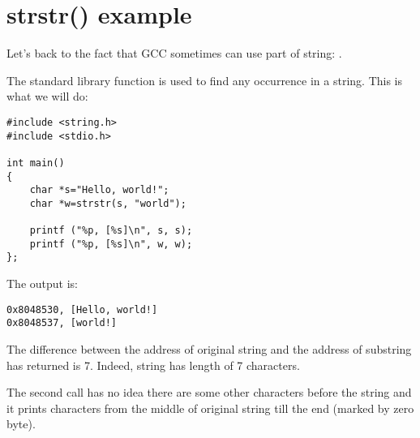 \section{strstr() example}
\label{strstr_example}

Let's back to the fact that GCC sometimes can use part of string: .

The  \CCpp standard library function is used to find any occurrence in a string.
This is what we will do:

\begin{lstlisting}
#include <string.h>
#include <stdio.h>

int main()
{
	char *s="Hello, world!";
	char *w=strstr(s, "world");

	printf ("%p, [%s]\n", s, s);
	printf ("%p, [%s]\n", w, w);
};
\end{lstlisting}

The output is:

\begin{lstlisting}
0x8048530, [Hello, world!]
0x8048537, [world!]
\end{lstlisting}

The difference between the address of original string and the address of substring  has returned is 7.
Indeed,  string has length of 7 characters.

The second \printf call has no idea there are some other characters before the string and it prints characters
from the middle of original string till the end (marked by zero byte).

